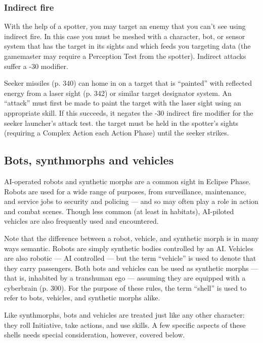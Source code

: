 \subsubsection{Indirect fire}

With the help of a spotter, you may target an enemy that you can’t see using indirect fire. In this case you must be meshed with a character, bot, or sensor system that has the target in its sights and which feeds you targeting data (the gamemaster may require a Perception Test from the spotter). Indirect attacks suffer a -30 modifier.

Seeker missiles (p. 340) can home in on a target that is ``painted'' with reflected energy from a laser sight (p. 342) or similar target designator system. An ``attack'' must first be made to paint the target with the laser sight using an appropriate skill. If this succeeds, it negates the -30 indirect fire modifier for the seeker launcher’s attack test. the target must be held in the spotter’s sights (requiring a Complex Action each Action Phase) until the seeker strikes.


\subsection{Bots, synthmorphs and vehicles}
\label{sec:bots-synthmorphs-vehicles}

AI-operated robots and synthetic morphs are a common sight in Eclipse Phase. Robots are used for a wide range of purposes, from surveillance, maintenance, and service jobs to security and policing --- and so may often play a role in action and combat scenes. Though less common (at least in habitats), AI-piloted vehicles are also frequently used and encountered.

Note that the difference between a robot, vehicle, and synthetic morph is in many ways semantic. Robots are simply synthetic bodies controlled by an AI. Vehicles are also robotic --- AI controlled --- but the term ``vehicle'' is used to denote that they carry passengers. Both bots and vehicles can be used as synthetic morphs --- that is, inhabited by a transhuman ego --- assuming they are equipped with a cyberbrain (p. 300). For the purpose of these rules, the term ``shell'' is used to refer to bots, vehicles, and synthetic morphs alike.

Like synthmorphs, bots and vehicles are treated just like any other character: they roll Initiative, take actions, and use skills. A few specific aspects of these shells needs special consideration, however, covered below.

